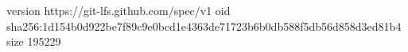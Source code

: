 version https://git-lfs.github.com/spec/v1
oid sha256:1d154b0d922be7f89c9e0bcd1e4363de71723b6b0db588f5db56d858d3ed81b4
size 195229
